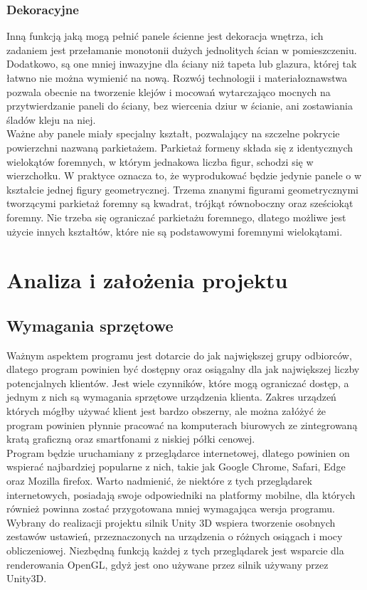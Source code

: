 \documentclass{article} %
\begin{document}
        \subsubsection{Dekoracyjne}
        Inną funkcją jaką mogą pełnić panele ścienne jest dekoracja wnętrza, ich zadaniem jest przełamanie monotonii dużych jednolitych ścian w pomieszczeniu. Dodatkowo, są one mniej inwazyjne dla ściany niż tapeta lub glazura, której tak łatwno nie można wymienić na nową. Rozwój technologii i materiałoznawstwa pozwala obecnie na tworzenie klejów i mocowań wytarczająco mocnych na przytwierdzanie paneli do ściany, bez wiercenia dziur w ścianie, ani zostawiania śladów kleju na niej.
        \\
        
        Ważne aby panele miały specjalny kształt, pozwalający na szczelne pokrycie powierzchni nazwaną parkietażem. Parkietaż formeny składa się z identycznych wielokątów foremnych, w którym jednakowa liczba figur, schodzi się w wierzchołku. W praktyce oznacza to, że wyprodukować będzie jedynie panele o w kształcie jednej figury geometrycznej. Trzema znanymi figurami geometrycznymi tworzącymi parkietaż foremny są kwadrat, trójkąt równoboczny oraz sześciokąt foremny. Nie trzeba się ograniczać parkietażu foremnego, dlatego możliwe jest użycie innych kształtów, które nie są podstawowymi foremnymi wielokątami.
        \\
        
\section{Analiza i założenia projektu}
    \subsection{Wymagania sprzętowe}
        Ważnym aspektem programu jest dotarcie do jak największej grupy odbiorców, dlatego program powinien być dostępny oraz osiągalny dla jak największej liczby potencjalnych klientów. Jest wiele czynników, które mogą ograniczać dostęp, a jednym z nich są wymagania sprzętowe urządzenia klienta. Zakres urządzeń których mógłby używać klient jest bardzo obszerny, ale można załóżyć że program powinien płynnie pracować na komputerach biurowych ze zintegrowaną kratą graficzną oraz smartfonami z niskiej półki cenowej.
        \\
        
        Program będzie uruchamiany z przeglądarce internetowej, dlatego powinien on wspierać najbardziej popularne z nich, takie jak Google Chrome, Safari, Edge oraz Mozilla firefox. Warto nadmienić, że niektóre z tych przeglądarek internetowych, posiadają swoje odpowiedniki na platformy mobilne, dla których również powinna zostać przygotowana mniej wymagająca wersja programu. Wybrany do realizacji projektu silnik Unity 3D wspiera tworzenie osobnych zestawów ustawień, przeznaczonych na urządzenia o różnych osiągach i mocy obliczeniowej. Niezbędną funkcją każdej z tych przeglądarek jest wsparcie dla renderowania OpenGL, gdyż jest ono używane przez silnik używany przez Unity3D.
        \\
        
\end{document}
